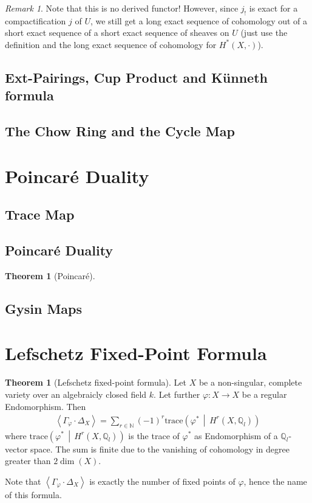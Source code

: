 \documentclass[english]{scrartcl}
\theoremstyle{definition}
\newtheorem{Thm}[Def]{Theorem}
\theoremstyle{remark}
\newtheorem{Rem}[Def]{Remark}
\newcommand*{\N}{\mathds{N}}
\newcommand*{\Z}{\mathds{Z}}
\newcommand*{\Q}{\mathds{Q}}
\newcommand*{\Zl}{\Z_l} %
\newcommand*{\Ql}{\Q_l} %
\newcommand*{\intProd}[2]{{#1\cdot#2}} %
\newcommand*{\intNum}[1]{{\left\langle{#1}\right\rangle}} %
\newcommand*{\Graph}[1]{{\Gamma_{#1}}} %
\newcommand*{\Diag}[1]{{\Delta_{#1}}} %
\newcommand*{\trace}[2]{{\text{trace}\left(#1 \,\middle|\, #2 \right)}} %
\renewcommand*{\phi}{\varphi}
\begin{document}
\begin{Rem}
Note that this is no derived functor!
However, since $j_!$ is exact for a compactification $j$ of $U$, we
still get a long exact sequence of cohomology out of a short exact
sequence of a short exact sequence of sheaves on $U$
(just use the definition and the long exact sequence of cohomology for
$H^*(X,\cdot)$).
\end{Rem}

\subsection{Ext-Pairings, Cup Product and Künneth formula}

\subsection{The Chow Ring and the Cycle Map}

\section{Poincaré Duality}
\subsection{Trace Map}
\subsection{Poincaré Duality}
\begin{Thm}[Poincaré]
  
\end{Thm}
\subsection{Gysin Maps}

\section{Lefschetz Fixed-Point Formula}

\begin{Thm}[Lefschetz fixed-point formula]\label{lefschetzthm}
  Let $X$ be a non-singular, complete variety over an algebraicly
  closed field $k$.
  Let further $\phi\colon X\to X$ be a regular Endomorphism.
  Then
  \begin{gather*}
    \intNum{\intProd{\Graph{\phi}}{\Diag{X}}}
    = \sum_{r\in\N} (-1)^r \trace{\phi^*}{H^r(X,\Ql)}
  \end{gather*}
  where $\trace{\phi^*}{H^r(X,\Ql)}$ is the trace of $\phi^*$ as
  Endomorphism of a $\Ql$-vector space. 
  The sum is finite due to the vanishing
  of cohomology in degree greater than $2\dim(X)$. 
\end{Thm}
Note that $\intNum{\intProd{\Graph{\phi}}{\Diag{X}}}$ is exactly the number of
fixed points of $\phi$, hence the name of this formula.
\end{document}
